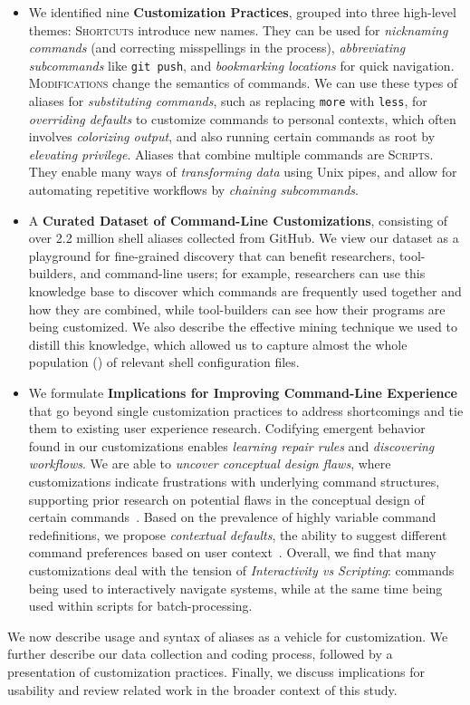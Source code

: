 \documentclass[smallextended,natbib]{svjour3}
\newcommand{\per}[1]{\numprint[\%]{#1}}
\newcommand{\cmd}[1]{{\texttt{#1}}}
\begin{document}
\begin{itemize}

	\item We identified nine \textbf{Customization Practices}, grouped into three high-level themes:
	\textsc{Shortcuts} introduce new names.
	They can be used for \emph{nicknaming commands} (and correcting misspellings in the process),
	\emph{abbreviating subcommands} like \texttt{git push},
	and \emph{bookmarking locations} for quick navigation.
	\textsc{Modifications} change the semantics of commands.
	We can use these types of aliases for \emph{substituting commands}, such as replacing \cmd{more} with \cmd{less},
	for \emph{overriding defaults} to customize commands to personal contexts, 
	which often involves \emph{colorizing output},
	and also running certain commands as root by \emph{elevating privilege}.
	Aliases that combine multiple commands are \textsc{Scripts}.
	They enable many ways of \emph{transforming data} using Unix pipes, 
	and allow for automating repetitive workflows by \emph{chaining subcommands}.
	\smallskip
	
	\item A \textbf{Curated Dataset of Command-Line Customizations}, consisting of over 2.2 million shell aliases collected from GitHub.
	We view our dataset as a playground for fine-grained discovery that can benefit researchers, tool-builders, and command-line users;
	for example, researchers can use this knowledge base to discover which commands are frequently used together and how they are combined, while tool-builders can see how their programs are being customized.
We also describe the effective mining technique we used to distill this knowledge, which allowed us to capture almost the whole population (\per{94.09}) of relevant shell configuration files.
	\smallskip	
	
	\item We formulate \textbf{Implications for Improving Command-Line Experience} that go beyond single customization practices to address shortcomings and tie them to existing user experience research.
	Codifying emergent behavior~\citep{fast:14} found in our customizations enables \emph{learning repair rules} and \emph{discovering workflows}.
	We are able to \emph{uncover conceptual design flaws}, where customizations indicate frustrations with underlying command structures, supporting prior research on potential flaws in the conceptual design of certain commands~\citep{perez:13}.
	Based on the prevalence of highly variable command redefinitions, we propose \emph{contextual defaults}, the ability to suggest different command preferences based on user context~\citep{stefanidis:11}.
	Overall, we find that many customizations deal with the tension of \emph{Interactivity vs Scripting}: commands being used to interactively navigate systems, while at the same time being used within scripts for batch-processing.
\end{itemize}
We now describe usage and syntax of aliases as a vehicle for customization. We further describe our data collection and coding process, followed by a presentation of customization practices. Finally, we discuss implications for usability and review related work in the broader context of this study.
\end{document}
